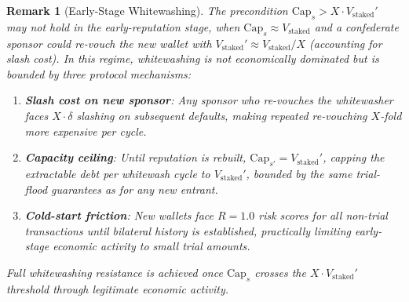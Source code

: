 \documentclass[11pt]{article}
\newtheorem{remark}[theorem]{Remark}
\begin{document}
\begin{remark}[Early-Stage Whitewashing]\label{rem:early_whitewash}
The precondition $\mathrm{Cap}_s > X \cdot V_{\text{staked}}'$ may not hold in the early-reputation stage, when $\text{Cap}_s \approx V_{\text{staked}}$ and a confederate sponsor could re-vouch the new wallet with $V_{\text{staked}}' \approx V_{\text{staked}}/X$ (accounting for slash cost). In this regime, whitewashing is not economically dominated but is bounded by three protocol mechanisms:
\begin{enumerate}
    \item \textbf{Slash cost on new sponsor}: Any sponsor who re-vouches the whitewasher faces $X \cdot \delta$ slashing on subsequent defaults, making repeated re-vouching $X$-fold more expensive per cycle.
    \item \textbf{Capacity ceiling}: Until reputation is rebuilt, $\mathrm{Cap}_{s'} = V_{\text{staked}}'$, capping the extractable debt per whitewash cycle to $V_{\text{staked}}'$, bounded by the same trial-flood guarantees as for any new entrant.
    \item \textbf{Cold-start friction}: New wallets face $R = 1.0$ risk scores for all non-trial transactions until bilateral history is established, practically limiting early-stage economic activity to small trial amounts.
\end{enumerate}
Full whitewashing resistance is achieved once $\mathrm{Cap}_s$ crosses the $X \cdot V_{\text{staked}}'$ threshold through legitimate economic activity.
\end{remark}
\end{document}
